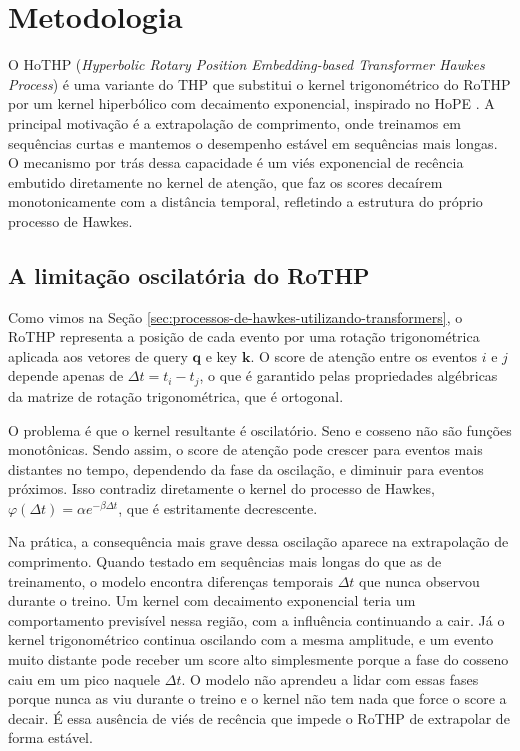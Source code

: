 \chapter{Metodologia}
\label{chap:metodologia}

O HoTHP (\textit{Hyperbolic Rotary Position Embedding-based Transformer Hawkes Process}) é uma variante do THP que substitui o kernel trigonométrico do RoTHP por um kernel hiperbólico com decaimento exponencial, inspirado no HoPE \cite{dai_hope_2025}. A principal motivação é a extrapolação de comprimento, onde treinamos em sequências curtas e mantemos o desempenho estável em sequências mais longas. O mecanismo por trás dessa capacidade é um viés exponencial de recência embutido diretamente no kernel de atenção, que faz os scores decaírem monotonicamente com a distância temporal, refletindo a estrutura do próprio processo de Hawkes.

\section{A limitação oscilatória do RoTHP}
\label{sec:limitacao-rothp}

Como vimos na Seção \ref{sec:processos-de-hawkes-utilizando-transformers}, o RoTHP representa a posição de cada evento por uma rotação trigonométrica aplicada aos vetores de query $\mathbf{q}$ e key $\mathbf{k}$. O score de atenção entre os eventos $i$ e $j$ depende apenas de $\Delta t = t_i - t_j$, o que é garantido pelas propriedades algébricas da matrize de rotação trigonométrica, que é ortogonal.

O problema é que o kernel resultante é oscilatório. Seno e cosseno não são funções monotônicas. Sendo assim, o score de atenção pode crescer para eventos mais distantes no tempo, dependendo da fase da oscilação, e diminuir para eventos próximos. Isso contradiz diretamente o kernel do processo de Hawkes, $\varphi(\Delta t) = \alpha e^{-\beta \Delta t}$, que é estritamente decrescente.

Na prática, a consequência mais grave dessa oscilação aparece na extrapolação de comprimento. Quando testado em sequências mais longas do que as de treinamento, o modelo encontra diferenças temporais $\Delta t$ que nunca observou durante o treino. Um kernel com decaimento exponencial teria um comportamento previsível nessa região, com a influência continuando a cair. Já o kernel trigonométrico continua oscilando com a mesma amplitude, e um evento muito distante pode receber um score alto simplesmente porque a fase do cosseno caiu em um pico naquele $\Delta t$. O modelo não aprendeu a lidar com essas fases porque nunca as viu durante o treino e o kernel não tem nada que force o score a decair. É essa ausência de viés de recência que impede o RoTHP de extrapolar de forma estável.

